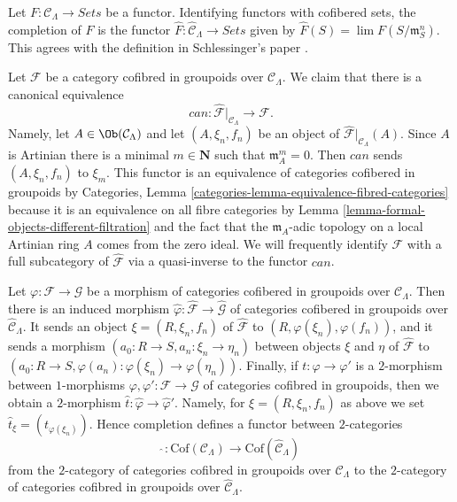 \begin{remark}
\label{remark-completion-functor}
Let $F: \mathcal{C}_\Lambda \to \textit{Sets}$ be a functor.
Identifying functors with cofibered sets, the completion of $F$ is the functor
$\widehat{F} : \widehat{\mathcal{C}}_\Lambda \to \textit{Sets}$
given by $\widehat{F}(S) = \lim F(S/\mathfrak{m}_S^{n})$.  This agrees
with the definition in Schlessinger's paper \cite{Sch}.
\end{remark}

\begin{remark}
\label{remark-restrict-completion}
Let $\mathcal{F}$ be a category cofibred in groupoids over
$\mathcal{C}_\Lambda$. We claim that there is a canonical
equivalence
$$
can :
\widehat{\mathcal{F}}|_{\mathcal{C}_\Lambda}
\longrightarrow
\mathcal{F}.
$$
Namely, let $A \in \Ob(\mathcal{C}_\Lambda)$ and let
$(A, \xi_n, f_n)$ be an object of
$\widehat{\mathcal{F}}|_{\mathcal{C}_\Lambda}(A)$.
Since $A$ is Artinian there is a minimal $m \in \mathbf{N}$
such that $\mathfrak m_A^m = 0$. Then $can$ sends $(A, \xi_n, f_n)$ to $\xi_m$.
This functor is an equivalence of categories cofibered in groupoids by
Categories, Lemma \ref{categories-lemma-equivalence-fibred-categories}
because it is an equivalence on all fibre categories by
Lemma \ref{lemma-formal-objects-different-filtration}
and the fact that the $\mathfrak m_A$-adic topology on a local
Artinian ring $A$ comes from the zero ideal. We will frequently identify
$\mathcal{F}$ with a full subcategory of $\widehat{\mathcal{F}}$ via a
quasi-inverse to the functor $can$.
\end{remark}

\begin{remark}
\label{remark-completion-morphism}
Let $\varphi : \mathcal{F} \to \mathcal{G}$ be a morphism of categories
cofibered in groupoids over $\mathcal{C}_\Lambda$. Then there is an induced
morphism
$\widehat{\varphi}: \widehat{\mathcal{F}} \to \widehat{\mathcal{G}}$
of categories cofibered in groupoids over $\widehat{\mathcal{C}}_\Lambda$.
It sends an object $\xi = (R, \xi_n, f_n)$ of
$\widehat{\mathcal{F}}$ to $(R, \varphi(\xi_n), \varphi(f_n))$, and it sends a
morphism $(a_0 : R \to S, a_n : \xi_n \to \eta_n)$ between
objects $\xi$ and $\eta$ of $\widehat{\mathcal{F}}$ to
$(a_0 : R \to S, \varphi(a_n) : \varphi(\xi_n) \to \varphi(\eta_n))$.
Finally, if $t : \varphi \to \varphi'$ is a $2$-morphism between
$1$-morphisms $\varphi, \varphi': \mathcal{F} \to \mathcal{G}$ of
categories cofibred in groupoids, then we obtain a $2$-morphism
$\widehat{t} : \widehat{\varphi} \to \widehat{\varphi}'$. Namely, for
$\xi = (R, \xi_n, f_n)$ as above we set
$\widehat{t}_\xi = (t_{\varphi(\xi_n)})$. Hence completion defines a
functor between $2$-categories
$$
\widehat{~} :
\text{Cof}(\mathcal{C}_\Lambda)
\longrightarrow
\text{Cof}(\widehat{\mathcal{C}}_\Lambda)
$$
from the $2$-category of categories cofibred in groupoids over
$\mathcal{C}_\Lambda$ to the $2$-category of categories cofibred
in groupoids over $\widehat{\mathcal{C}}_\Lambda$.
\end{remark}

